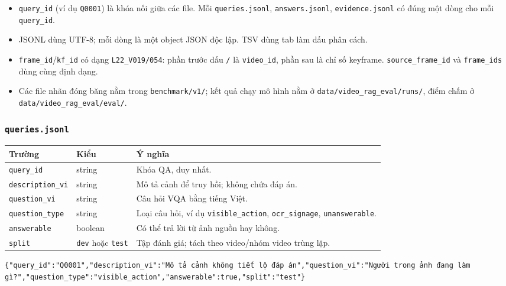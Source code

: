 \documentclass[12pt,a4paper,onecolumn]{article}
\begin{document}
\begin{itemize}
  \item \texttt{query\_id} (ví dụ \texttt{Q0001}) là khóa nối giữa các file. Mỗi \texttt{queries.jsonl}, \texttt{answers.jsonl}, \texttt{evidence.jsonl} có đúng một dòng cho mỗi \texttt{query\_id}.
  \item JSONL dùng UTF-8; mỗi dòng là một object JSON độc lập. TSV dùng tab làm dấu phân cách.
  \item \texttt{frame\_id}/\texttt{kf\_id} có dạng \texttt{L22\_V019/054}: phần trước dấu \texttt{/} là \texttt{video\_id}, phần sau là chỉ số keyframe. \texttt{source\_frame\_id} và \texttt{frame\_ids} dùng cùng định dạng.
  \item Các file nhãn đóng băng nằm trong \texttt{benchmark/v1/}; kết quả chạy mô hình nằm ở \texttt{data/video\_rag\_eval/runs/}, điểm chấm ở \texttt{data/video\_rag\_eval/eval/}.
\end{itemize}


\subsubsection{\texttt{queries.jsonl}}

\noindent
\begin{tabularx}{\textwidth}{l l Y}
\toprule
Trường & Kiểu & Ý nghĩa \\
\midrule
\texttt{query\_id} & string & Khóa QA, duy nhất. \\
\texttt{description\_vi} & string & Mô tả cảnh để truy hồi; không chứa đáp án. \\
\texttt{question\_vi} & string & Câu hỏi VQA bằng tiếng Việt. \\
\texttt{question\_type} & string & Loại câu hỏi, ví dụ \texttt{visible\_action}, \texttt{ocr\_signage}, \texttt{unanswerable}. \\
\texttt{answerable} & boolean & Có thể trả lời từ ảnh nguồn hay không. \\
\texttt{split} & \texttt{dev} hoặc \texttt{test} & Tập đánh giá; tách theo video/nhóm video trùng lặp. \\
\bottomrule
\end{tabularx}


\begin{lstlisting}[]
{"query_id":"Q0001","description_vi":"Mô tả cảnh không tiết lộ đáp án","question_vi":"Người trong ảnh đang làm gì?","question_type":"visible_action","answerable":true,"split":"test"}
\end{lstlisting}
\end{document}
